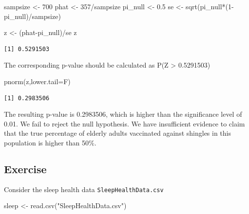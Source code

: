\documentclass[
  letterpaper,
  DIV=11,
  numbers=noendperiod]{scrartcl}
\newenvironment{Shaded}{\begin{snugshade}}{\end{snugshade}}
\newcommand{\AttributeTok}[1]{\textcolor[rgb]{0.40,0.45,0.13}{#1}}
\newcommand{\DecValTok}[1]{\textcolor[rgb]{0.68,0.00,0.00}{#1}}
\newcommand{\FloatTok}[1]{\textcolor[rgb]{0.68,0.00,0.00}{#1}}
\newcommand{\FunctionTok}[1]{\textcolor[rgb]{0.28,0.35,0.67}{#1}}
\newcommand{\NormalTok}[1]{\textcolor[rgb]{0.00,0.23,0.31}{#1}}
\newcommand{\OtherTok}[1]{\textcolor[rgb]{0.00,0.23,0.31}{#1}}
\newcommand{\SpecialCharTok}[1]{\textcolor[rgb]{0.37,0.37,0.37}{#1}}
\newcommand{\StringTok}[1]{\textcolor[rgb]{0.13,0.47,0.30}{#1}}
\begin{document}
\begin{Shaded}
\begin{Highlighting}[]
\NormalTok{sampsize }\OtherTok{\textless{}{-}} \DecValTok{700}
\NormalTok{phat }\OtherTok{\textless{}{-}} \DecValTok{357}\SpecialCharTok{/}\NormalTok{sampsize}
\NormalTok{pi\_null }\OtherTok{\textless{}{-}} \FloatTok{0.5}
\NormalTok{se }\OtherTok{\textless{}{-}} \FunctionTok{sqrt}\NormalTok{(pi\_null}\SpecialCharTok{*}\NormalTok{(}\DecValTok{1}\SpecialCharTok{{-}}\NormalTok{pi\_null)}\SpecialCharTok{/}\NormalTok{sampsize)}

\NormalTok{z }\OtherTok{\textless{}{-}}\NormalTok{ (phat}\SpecialCharTok{{-}}\NormalTok{pi\_null)}\SpecialCharTok{/}\NormalTok{se}
\NormalTok{z}
\end{Highlighting}
\end{Shaded}

\begin{verbatim}
[1] 0.5291503
\end{verbatim}

The corresponding p-value should be calculated as P(Z \textgreater{}
0.5291503)

\begin{Shaded}
\begin{Highlighting}[]
\FunctionTok{pnorm}\NormalTok{(z,}\AttributeTok{lower.tail=}\NormalTok{F)}
\end{Highlighting}
\end{Shaded}

\begin{verbatim}
[1] 0.2983506
\end{verbatim}

The resulting p-value is 0.2983506, which is higher than the
significance level of 0.01. We fail to reject the null hypothesis. We
have insufficient evidence to claim that the true percentage of elderly
adults vaccinated against shingles in this population is higher than
50\%.

\subsection{Exercise}\label{exercise-5}

Consider the sleep health data \texttt{SleepHealthData.csv}

\begin{Shaded}
\begin{Highlighting}[]
\NormalTok{sleep }\OtherTok{\textless{}{-}} \FunctionTok{read.csv}\NormalTok{(}\StringTok{"SleepHealthData.csv"}\NormalTok{)}
\end{Highlighting}
\end{Shaded}
\end{document}
